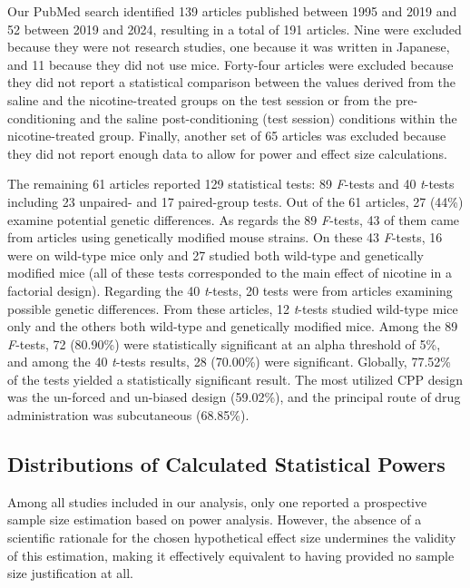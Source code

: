 \documentclass[authordate, meta, issue]{jote-new-article}
\begin{document}
	Our PubMed search identified 139 articles published between 1995 and 2019 and 52 between 2019 and 2024, resulting in a total of 191 articles. Nine were excluded because they were not research studies, one because it was written in Japanese, and 11 because they did not use mice. Forty-four articles were excluded because they did not report a statistical comparison between the values derived from the saline and the nicotine-treated groups on the test session or from the pre-conditioning and the saline post-conditioning (test session) conditions within the nicotine-treated group. Finally, another set of 65 articles was excluded because they did not report enough data to allow for power and effect size calculations.



	The remaining 61 articles reported 129 statistical tests: 89 \emph{F}-tests and 40 \emph{t}-tests including 23 unpaired- and 17 paired-group tests. Out of the 61 articles, 27 (44\%) examine potential genetic differences. As regards the 89 \emph{F}-tests, 43 of them came from articles using genetically modified mouse strains. On these 43 \emph{F}-tests, 16 were on wild-type mice only and 27 studied both wild-type and genetically modified mice (all of these tests corresponded to the main effect of nicotine in a factorial design). Regarding the 40 \emph{t}-tests, 20 tests were from articles examining possible genetic differences. From these articles, 12 \emph{t}-tests studied wild-type mice only and the others both wild-type and genetically modified mice. Among the 89 \emph{F}-tests, 72 (80.90\%) were statistically significant at an alpha threshold of 5\%, and among the 40 \emph{t}-tests results, 28 (70.00\%) were significant. Globally, 77.52\% of the tests yielded a statistically significant result. The most utilized CPP design was the un-forced and un-biased design (59.02\%), and the principal route of drug administration was subcutaneous (68.85\%).



	\subsection{Distributions of Calculated Statistical Powers}



	Among all studies included in our analysis, only one reported a prospective sample size estimation based on power analysis. However, the absence of a scientific rationale for the chosen hypothetical effect size undermines the validity of this estimation, making it effectively equivalent to having provided no sample size justification at all.
\end{document}
